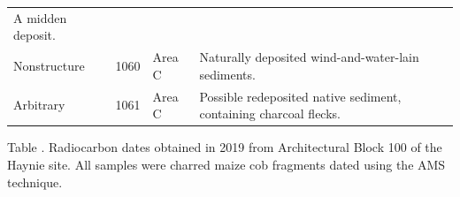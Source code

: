 \documentclass[
  12pt,
]{krantz}
\begin{document}
\begin{longtable}[]{@{}llll@{}}
\begin{minipage}[t]{0.38\columnwidth}
A midden deposit.\strut
\end{minipage}\tabularnewline
\begin{minipage}[t]{0.18\columnwidth}\raggedright
Nonstructure\strut
\end{minipage} & \begin{minipage}[t]{0.11\columnwidth}\raggedright
1060\strut
\end{minipage} & \begin{minipage}[t]{0.16\columnwidth}\raggedright
Area C\strut
\end{minipage} & \begin{minipage}[t]{0.38\columnwidth}\raggedright
Naturally deposited
wind-and-water-lain
sediments.\strut
\end{minipage}\tabularnewline
\begin{minipage}[t]{0.18\columnwidth}\raggedright
Arbitrary\strut
\end{minipage} & \begin{minipage}[t]{0.11\columnwidth}\raggedright
1061\strut
\end{minipage} & \begin{minipage}[t]{0.16\columnwidth}\raggedright
Area C\strut
\end{minipage} & \begin{minipage}[t]{0.38\columnwidth}\raggedright
Possible redeposited native
sediment, containing
charcoal flecks.\strut
\end{minipage}\tabularnewline
\bottomrule
\end{longtable}

Table . Radiocarbon dates obtained in 2019 from Architectural Block 100 of the Haynie site. All samples were charred maize cob fragments dated using the AMS technique.
\end{document}
